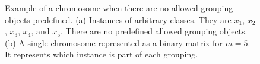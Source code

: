 \begin{figure}[!ht]
\begin{subfigure}{0.6\textwidth}
{\begin{circuitikz}
        
                \end{circuitikz}
            }%
            \caption{} 
            \label{fig:genome_2_example}
        \end{subfigure}
        \caption[Example of a chromosome 2]{Example of a chromosome when there are no allowed grouping objects predefined. (a) Instances of arbitrary classes. They are $x_1$, $x_2$, $x_3$, $x_4$, and $x_5$. There are no predefined allowed grouping objects. (b) A single chromosome represented as a binary matrix for $m=5$. It represents which instance is part of each grouping.} 
        \label{fig:genome_2}
    \end{figure}